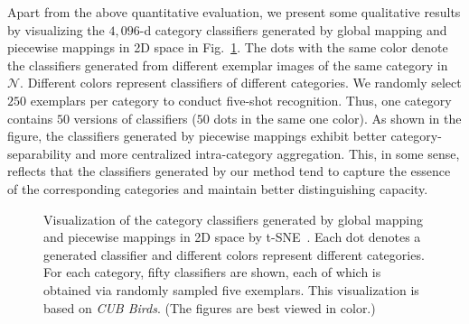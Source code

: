 \documentclass[10pt,twocolumn,letterpaper]{article}
\begin{document}
Apart from the above quantitative evaluation, we present some qualitative results by visualizing the $4,096$-d category classifiers generated by global mapping and piecewise mappings in 2D space in Fig.~\ref{fig:tsne}. The dots with the same color denote the classifiers generated from different exemplar images of the same category in $\mathcal{N}$. Different colors represent classifiers of different categories. We randomly select $250$ exemplars per category to conduct five-shot recognition. Thus, one category contains $50$ versions of classifiers ($50$ dots in the same one color). As shown in the figure, the classifiers generated by piecewise mappings exhibit better category-separability and more centralized intra-category aggregation. This, in some sense, reflects that the classifiers generated by our method tend to capture the essence of the corresponding categories and maintain better distinguishing capacity.

\begin{figure}[t]
 \centering
 \caption{Visualization of the category classifiers generated by global mapping and piecewise mappings in 2D space by t-SNE~\cite{tsne}. Each dot denotes a generated classifier and different colors represent different categories. For each category, fifty classifiers are shown, each of which is obtained via randomly sampled five exemplars. This visualization is based on \emph{CUB Birds}. (The figures are best viewed in color.)} \label{fig:tsne}
\end{figure}
\end{document}
